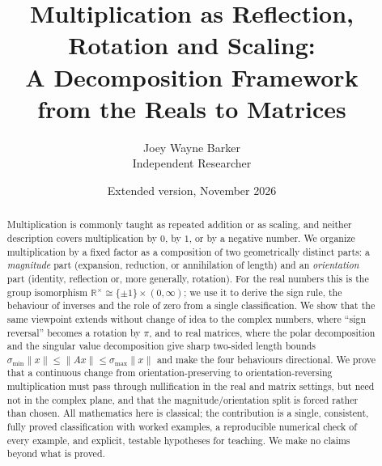 \documentclass[12pt]{article}
\title{Multiplication as Reflection, Rotation and Scaling:\\
A Decomposition Framework\\from the Reals to Matrices}
\author{Joey Wayne Barker \\ Independent Researcher}
\date{Extended version, November 2026}
\theoremstyle{definition}
\theoremstyle{remark}
\newcommand{\R}{\mathbb{R}}
\newcommand{\norm}[1]{\lVert #1\rVert}
\begin{document}
\maketitle

\begin{center}
\end{center}

\begin{abstract}
Multiplication is commonly taught as repeated addition or as scaling, and neither description covers multiplication by $0$, by $1$, or by a negative number. We organize multiplication by a fixed factor as a composition of two geometrically distinct parts: a \emph{magnitude} part (expansion, reduction, or annihilation of length) and an \emph{orientation} part (identity, reflection or, more generally, rotation). For the real numbers this is the group isomorphism $\R^{\times}\cong\{\pm1\}\times(0,\infty)$; we use it to derive the sign rule, the behaviour of inverses and the role of zero from a single classification. We show that the same viewpoint extends without change of idea to the complex numbers, where ``sign reversal'' becomes a rotation by $\pi$, and to real matrices, where the polar decomposition and the singular value decomposition give sharp two-sided length bounds $\sigma_{\min}\norm{x}\le\norm{Ax}\le\sigma_{\max}\norm{x}$ and make the four behaviours directional. We prove that a continuous change from orientation-preserving to orientation-reversing multiplication must pass through nullification in the real and matrix settings, but need not in the complex plane, and that the magnitude/orientation split is forced rather than chosen. All mathematics here is classical; the contribution is a single, consistent, fully proved classification with worked examples, a reproducible numerical check of every example, and explicit, testable hypotheses for teaching. We make no claims beyond what is proved.
\end{abstract}

\tableofcontents
\newpage
\end{document}
